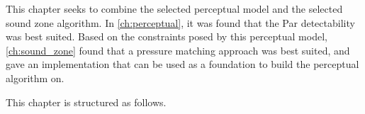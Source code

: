 This chapter seeks to combine the selected perceptual model and the selected sound zone algorithm.
In \autoref{ch:perceptual}, it was found that the Par detectability was best suited.
Based on the constraints posed by this perceptual model, \autoref{ch:sound_zone} found that a pressure matching approach was 
best suited, and gave an implementation  that can be used as a foundation to build the perceptual algorithm on. 

This chapter is structured as follows.
